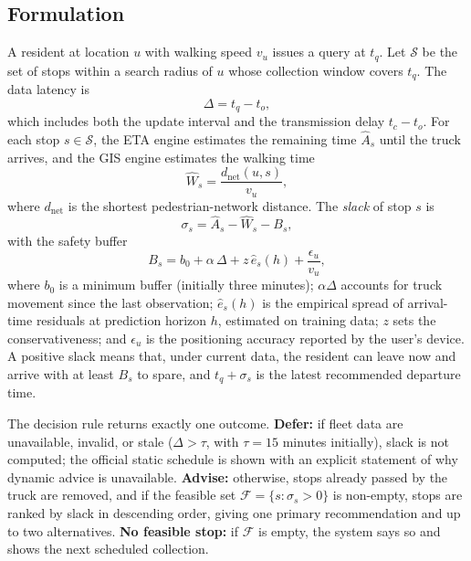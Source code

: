 \subsection{Formulation}
A resident at location $u$ with walking speed $v_u$ issues a query at $t_q$. Let $\mathcal{S}$ be the set of stops within a search radius of $u$ whose collection window covers $t_q$. The data latency is
\begin{equation}
\Delta = t_q - t_o ,
\label{eq:latency}
\end{equation}
which includes both the update interval and the transmission delay $t_c - t_o$. For each stop $s\in\mathcal{S}$, the ETA engine estimates the remaining time $\hat{A}_s$ until the truck arrives, and the GIS engine estimates the walking time
\begin{equation}
\hat{W}_s = \frac{d_{\mathrm{net}}(u,s)}{v_u},
\label{eq:walk}
\end{equation}
where $d_{\mathrm{net}}$ is the shortest pedestrian-network distance. The \emph{slack} of stop $s$ is
\begin{equation}
\sigma_s = \hat{A}_s - \hat{W}_s - B_s ,
\label{eq:slack}
\end{equation}
with the safety buffer
\begin{equation}
B_s = b_0 + \alpha\,\Delta + z\,\hat{e}_{s}(h) + \frac{\epsilon_u}{v_u},
\label{eq:buffer}
\end{equation}
where $b_0$ is a minimum buffer (initially three minutes); $\alpha\Delta$ accounts for truck movement since the last observation; $\hat{e}_{s}(h)$ is the empirical spread of arrival-time residuals at prediction horizon $h$, estimated on training data; $z$ sets the conservativeness; and $\epsilon_u$ is the positioning accuracy reported by the user's device. A positive slack means that, under current data, the resident can leave now and arrive with at least $B_s$ to spare, and $t_q + \sigma_s$ is the latest recommended departure time.

The decision rule returns exactly one outcome. \textbf{Defer:} if fleet data are unavailable, invalid, or stale ($\Delta > \tau$, with $\tau = 15$ minutes initially), slack is not computed; the official static schedule is shown with an explicit statement of why dynamic advice is unavailable. \textbf{Advise:} otherwise, stops already passed by the truck are removed, and if the feasible set $\mathcal{F} = \{s : \sigma_s > 0\}$ is non-empty, stops are ranked by slack in descending order, giving one primary recommendation and up to two alternatives. \textbf{No feasible stop:} if $\mathcal{F}$ is empty, the system says so and shows the next scheduled collection.

